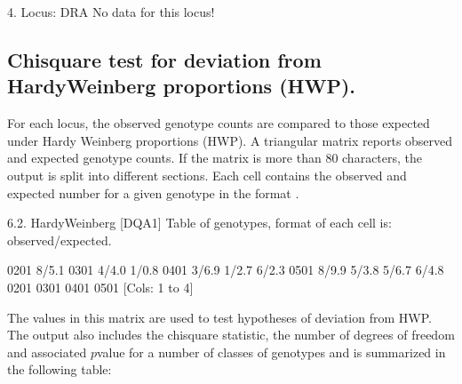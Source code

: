 \documentclass[letterpaper,10pt,english,openany,oneside]{sphinxmanual}
\begin{document}
\begin{sphinxVerbatim}[commandchars=\\\{\}]
4. Locus: DRA
\PYGZus{}\PYGZus{}\PYGZus{}\PYGZus{}\PYGZus{}\PYGZus{}\PYGZus{}\PYGZus{}\PYGZus{}\PYGZus{}\PYGZus{}\PYGZus{}\PYGZus{}
 No data for this locus!
\end{sphinxVerbatim}


\subsection{Chi\sphinxhyphen{}square test for deviation from Hardy\sphinxhyphen{}Weinberg proportions (HWP).}
\label{\detokenize{docs/guide-chapter-instructions:chi-square-test-for-deviation-from-hardy-weinberg-proportions-hwp}}\label{\detokenize{docs/guide-chapter-instructions:instructions-hardyweinberg}}
\sphinxAtStartPar
For each locus, the observed genotype counts are compared to those
expected under Hardy Weinberg proportions (HWP). A triangular matrix
reports observed and expected genotype counts. If the matrix is more
than 80 characters, the output is split into different sections. Each
cell contains the observed and expected number for a given genotype in
the format .

\begin{sphinxVerbatim}[commandchars=\\\{\}]
6.2. HardyWeinberg [DQA1]
\PYGZhy{}\PYGZhy{}\PYGZhy{}\PYGZhy{}\PYGZhy{}\PYGZhy{}\PYGZhy{}\PYGZhy{}\PYGZhy{}\PYGZhy{}\PYGZhy{}\PYGZhy{}\PYGZhy{}\PYGZhy{}\PYGZhy{}\PYGZhy{}\PYGZhy{}\PYGZhy{}\PYGZhy{}\PYGZhy{}\PYGZhy{}\PYGZhy{}\PYGZhy{}\PYGZhy{}\PYGZhy{}
Table of genotypes, format of each cell is: observed/expected.

0201 8/5.1
0301 4/4.0 1/0.8
0401 3/6.9 1/2.7 6/2.3
0501 8/9.9 5/3.8 5/6.7 6/4.8
      0201  0301  0401  0501
                             [Cols: 1 to 4]
\end{sphinxVerbatim}

\sphinxAtStartPar
The values in this matrix are used to test hypotheses of deviation from
HWP. The output also includes the chi\sphinxhyphen{}square statistic, the number of
degrees of freedom and associated \(p\)\sphinxhyphen{}value for a number of classes of
genotypes and is summarized in the following table:
\end{document}
